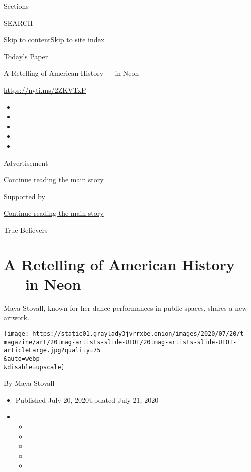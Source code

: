 Sections

SEARCH

\protect\hyperlink{site-content}{Skip to
content}\protect\hyperlink{site-index}{Skip to site index}

\href{https://myaccount.nytimes3xbfgragh.onion/auth/login?response_type=cookie\&client_id=vi}{}

\href{https://www.nytimes3xbfgragh.onion/section/todayspaper}{Today's
Paper}

A Retelling of American History --- in Neon

\url{https://nyti.ms/2ZKVTxP}

\begin{itemize}
\item
\item
\item
\item
\item
\end{itemize}

Advertisement

\protect\hyperlink{after-top}{Continue reading the main story}

Supported by

\protect\hyperlink{after-sponsor}{Continue reading the main story}

True Believers

\hypertarget{a-retelling-of-american-history--in-neon}{%
\section{A Retelling of American History --- in
Neon}\label{a-retelling-of-american-history--in-neon}}

Maya Stovall, known for her dance performances in public spaces, shares
a new artwork.

\texttt{[image: https://static01.graylady3jvrrxbe.onion/images/2020/07/20/t-magazine/art/20tmag-artists-slide-UIOT/20tmag-artists-slide-UIOT-articleLarge.jpg?quality=75\\\&auto=webp\\\&disable=upscale]}

By Maya Stovall

\begin{itemize}
\item
  Published July 20, 2020Updated July 21, 2020
\item
  \begin{itemize}
  \item
  \item
  \item
  \item
  \item
  \end{itemize}
\end{itemize}

